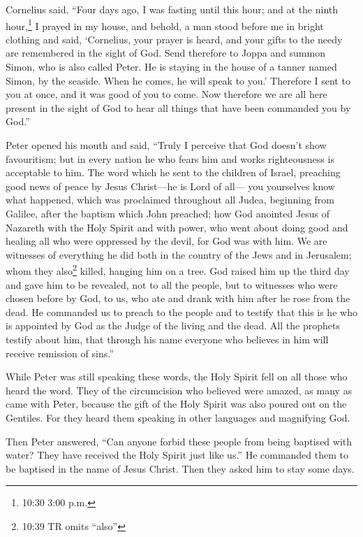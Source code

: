  Cornelius said, ``Four days ago, I was fasting until this
hour; and at the ninth hour,\footnote{10:30 3:00 p.m.} I prayed in my
house, and behold, a man stood before me in bright clothing
 and said, `Cornelius, your prayer is heard, and your gifts
to the needy are remembered in the sight of God.  Send
therefore to Joppa and summon Simon, who is also called Peter. He is
staying in the house of a tanner named Simon, by the seaside. When he
comes, he will speak to you.'  Therefore I sent to you at
once, and it was good of you to come. Now therefore we are all here
present in the sight of God to hear all things that have been commanded
you by God.''

 Peter opened his mouth and said, ``Truly I perceive that
God doesn't show favouritism;  but in every nation he who
fears him and works righteousness is acceptable to him. 
The word which he sent to the children of Israel, preaching good news of
peace by Jesus Christ---he is Lord of all---  you
yourselves know what happened, which was proclaimed throughout all
Judea, beginning from Galilee, after the baptism which John preached;
 how God anointed Jesus of Nazareth with the Holy Spirit
and with power, who went about doing good and healing all who were
oppressed by the devil, for God was with him.  We are
witnesses of everything he did both in the country of the Jews and in
Jerusalem; whom they also\footnote{10:39 TR omits ``also''} killed,
hanging him on a tree.  God raised him up the third day and
gave him to be revealed,  not to all the people, but to
witnesses who were chosen before by God, to us, who ate and drank with
him after he rose from the dead.  He commanded us to preach
to the people and to testify that this is he who is appointed by God as
the Judge of the living and the dead.  All the prophets
testify about him, that through his name everyone who believes in him
will receive remission of sins.''

 While Peter was still speaking these words, the Holy
Spirit fell on all those who heard the word.  They of the
circumcision who believed were amazed, as many as came with Peter,
because the gift of the Holy Spirit was also poured out on the Gentiles.
 For they heard them speaking in other languages and
magnifying God.

Then Peter answered,  ``Can anyone forbid these people from
being baptised with water? They have received the Holy Spirit just like
us.''  He commanded them to be baptised in the name of
Jesus Christ. Then they asked him to stay some days.

